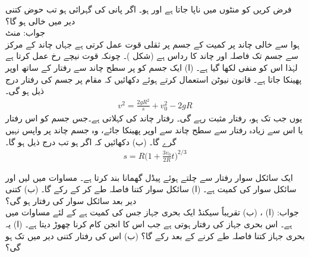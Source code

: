 فرض کریں  کو منٹوں میں ناپا جاتا ہے اور  ہو۔  اگر پانی کی گہرائی  ہو تب حوض کتنی دیر میں  خالی ہو گا؟ \\
جواب:\quad {} منٹ
\\
ہوا سے خالی چاند پر کمیت  کے جسم پر ثقلی قوت  عمل کرتی ہے جہاں  چاند کے مرکز سے جسم تک فاصلہ  اور چاند کا رداس  ہے
 (شکل )۔ چونکہ قوت  نیچے رخ عمل کرتا ہے لہٰذا اس کو  منفی لکھا گیا ہے۔ (ا) ایک جسم کو  پر سطح چاند سے   رفتار کے ساتھ اوپر پھینکا جاتا ہے۔ قانون نیوٹن  استعمال کرتے ہوئے  دکھائیں کہ مقام  پر جسم کی رفتار درج ذیل ہو گی۔
\begin{align*}
v^2=\frac{2gR^2}{s}+v_0^2-2gR
\end{align*} 
یوں جب تک  ہو، رفتار مثبت رہے گی۔ رفتار  چاند کی  کہلاتی ہے۔جس جسم کو  اس رفتار یا اس سے زیادہ رفتار سے سطح چاند سے اوپر پھینکا جائے، وہ جسم چاند پر واپس نہیں گرے گا۔ (ب) دکھائیں کہ اگر  ہو تب درج ذیل ہو گا۔
\begin{align*}
s=R\big(1+\frac{3v_0}{2R}t\big)^{2/3}
\end{align*} 

ایک سائکل سوار  رفتار سے چلتے ہوئے پیڈل گھمانا بند کرتا ہے۔ مساوات  میں  لیں اور سائکل سوار کی کمیت  ہے۔  (ا) سائکل سوار  کتنا فاصلہ طے کر کے رکے گا۔ (ب) کتنی دیر بعد سائکل سوار کی رفتار  ہو گی؟\\
جواب:\quad
(ا) ، (ب) تقریباً  سیکنڈ
ایک بحری جہاز جس کی کمیت  ہے کے لئے  مساوات  میں  ہے۔ اس بحری جہاز کی رفتار  ہوتی ہے جب اس کا انجن کام کرنا چھوڑ دیتا ہے۔ (ا) یہ بحری جہاز کتنا فاصلہ طے کرنے کے بعد رکے گا؟ (ب) اس کی رفتار کتنی دیر میں  تک ہو گی؟

